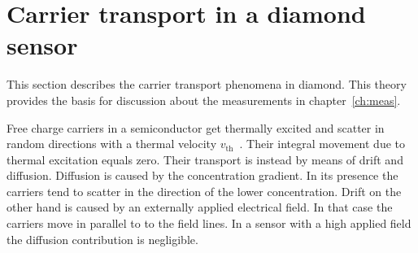 \section{Carrier transport in a diamond sensor} 
This section describes the carrier transport phenomena in diamond. This theory provides the basis for discussion about the measurements in chapter~\ref{ch:meas}. 

Free charge carriers in a semiconductor get thermally excited and scatter in random directions with a thermal velocity $v_{\mathrm{th}}$~\cite{}. Their integral movement due to thermal excitation equals zero. Their transport is instead by means of drift and diffusion. Diffusion is caused by the concentration gradient. In its presence the carriers tend to scatter in the direction of the lower concentration. Drift on the other hand is caused by an externally applied electrical field. In that case the carriers move in parallel to to the field lines. In a sensor with a high applied field the diffusion contribution is negligible. 


